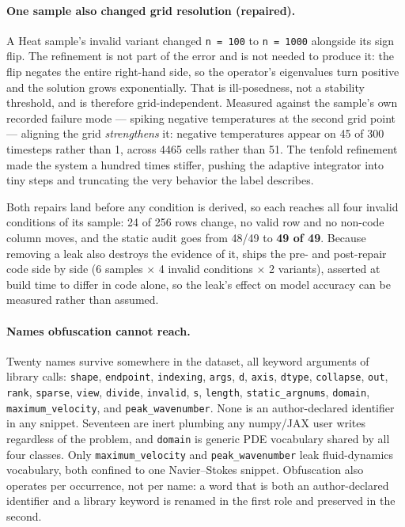 \documentclass[11pt]{article}
\DeclareRobustCommand{\fpath}[1]{\texttt{\detokenize{#1}}}
\begin{document}
\paragraph{One sample also changed grid resolution (repaired).} A Heat sample's invalid
variant changed \texttt{n = 100} to \texttt{n = 1000} alongside its sign flip. The refinement
is not part of the error and is not needed to produce it: the flip negates the entire
right-hand side, so the operator's eigenvalues turn positive and the solution grows
exponentially. That is ill-posedness, not a stability threshold, and is therefore
grid-independent. Measured against the sample's own recorded failure mode --- spiking negative
temperatures at the second grid point --- aligning the grid \emph{strengthens} it: negative
temperatures appear on 45 of 300 timesteps rather than 1, across 4465 cells rather than 51.
The tenfold refinement made the system a hundred times stiffer, pushing the adaptive
integrator into tiny steps and truncating the very behavior the label describes.

Both repairs land before any condition is derived, so each reaches all four invalid conditions
of its sample: 24 of 256 rows change, no valid row and no non-code column moves, and the
static audit goes from 48/49 to \textbf{49 of 49}. Because removing a leak also destroys the
evidence of it, \fpath{data/leak_ablation_jul28.csv} ships the pre- and post-repair code side
by side (6 samples $\times$ 4 invalid conditions $\times$ 2 variants), asserted at build time
to differ in code alone, so the leak's effect on model accuracy can be measured rather than
assumed.

\paragraph{Names obfuscation cannot reach.} Twenty names survive somewhere in the dataset, all
keyword arguments of library calls: \texttt{shape}, \texttt{endpoint}, \texttt{indexing},
\texttt{args}, \texttt{d}, \texttt{axis}, \texttt{dtype}, \texttt{collapse}, \texttt{out},
\texttt{rank}, \texttt{sparse}, \texttt{view}, \texttt{divide}, \texttt{invalid}, \texttt{s},
\texttt{length}, \texttt{static\_argnums}, \texttt{domain}, \texttt{maximum\_velocity}, and
\texttt{peak\_wavenumber}. None is an author-declared identifier in any snippet. Seventeen are
inert plumbing any numpy/JAX user writes regardless of the problem, and \texttt{domain} is
generic PDE vocabulary shared by all four classes. Only \texttt{maximum\_velocity} and
\texttt{peak\_wavenumber} leak fluid-dynamics vocabulary, both confined to one Navier--Stokes
snippet. Obfuscation also operates per occurrence, not per name: a word that is both an
author-declared identifier and a library keyword is renamed in the first role and preserved in
the second.
\end{document}
